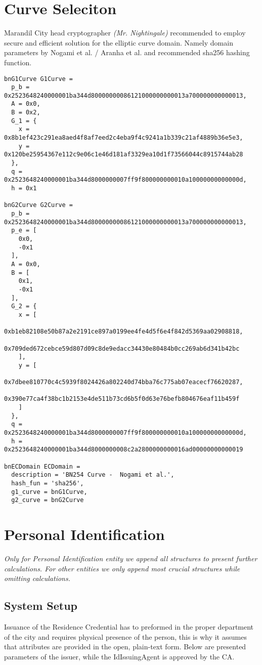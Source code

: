 \section{Curve Seleciton}
Marandil City head cryptographer \emph{(Mr. Nightingale)} recommended to employ secure and efficient solution for the elliptic curve domain. Namely domain parameters by Nogami et al. / Aranha et al. \cite{kasamatsu-bncurves-02} and recommended sha256 hashing function.

\small
\begin{verbatim}
bnG1Curve G1Curve =
  p_b = 0x2523648240000001ba344d80000000086121000000000013a700000000000013,
  A = 0x0,
  B = 0x2,
  G_1 = {
    x = 0x8b1ef423c291ea8aed4f8af7eed2c4eba9f4c9241a1b339c21af4889b36e5e3,
    y = 0x120be25954367e112c9e06c1e46d181af3329ea10d1f73566044c8915744ab28
  },
  q = 0x2523648240000001ba344d8000000007ff9f800000000010a10000000000000d,
  h = 0x1

bnG2Curve G2Curve =
  p_b = 0x2523648240000001ba344d80000000086121000000000013a700000000000013,
  p_e = [
    0x0,
    -0x1
  ],
  A = 0x0,
  B = [
    0x1,
    -0x1
  ],
  G_2 = {
    x = [
      0xb1eb82108e50b87a2e2191ce897a0199ee4fe4d5f6e4f842d5369aa02908818,
      0x709ded672cebce59d807d09c8de9edacc34430e80484b0cc269ab6d341b42bc
    ],
    y = [
      0x7dbee810770c4c5939f8024426a802240d74bba76c775ab07eacecf76620287,
      0x390e77ca4f38bc1b2153e4de511b73cd6b5f0d63e76befb804676eaf11b459f
    ]
  },
  q = 0x2523648240000001ba344d8000000007ff9f800000000010a10000000000000d,
  h = 0x2523648240000001ba344d8000000008c2a2800000000016ad00000000000019

bnECDomain ECDomain =
  description = 'BN254 Curve -  Nogami et al.',
  hash_fun = 'sha256',
  g1_curve = bnG1Curve,
  g2_curve = bnG2Curve

\end{verbatim}
\normalsize

\section{Personal Identification}

\emph{Only for Personal Identification entity we append all structures to present further calculations. For other entities we only append most crucial structures while omitting calculations.}

\subsection{System Setup}
Issuance of the Residence Credential has to preformed in the proper department of the city and requires physical presence of the person, this is why it assumes that attributes are provided in the open, plain-text form. Below are presented parameters of the issuer, while the \textsf{IdIssuingAgent} is approved by the CA. 

